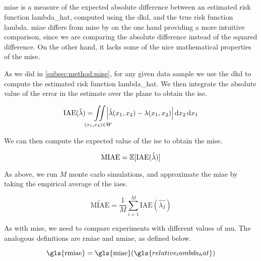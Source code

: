 \subsection{\texorpdfstring{}{}}
\label{subsec:method:miae}

\Gls{miae} is a measure of the expected absolute difference between an estimated risk function \gls{lambda_hat},
computed using the \gls{dkd}, and the true risk function \gls{lambda}.
\Gls{miae} differs from \gls{mise} by on the one hand providing a more intuitive comparison,
since we are comparing the absolute difference instead of the squared difference.
On the other hand, it lacks some of the nice mathematical properties of the \gls{mise}.

As we did in \autoref{subsec:method:mise}, for any given data sample we use the \gls{dkd} to compute the estimated risk function \gls{lambda_hat}.
We then integrate the absolute value of the error in the estimate over the plane to obtain the \gls{ise}.

\begin{equation}
    \mbox{IAE}(\hat{\lambda}) = 
        \iintW{
            \left| \hat{\lambda}\xvec - \lambda\xvec \right|
        }
\end{equation}

We can then compute the expected value of the \gls{ise} to obtain the \gls{mise}.

\begin{equation}
    \mbox{MIAE} = \mathbb{E} [\mbox{IAE}(\hat{\lambda})]
\end{equation}

As above, we run $M$ monte carlo simulations,
and approximate the \gls{miae} by taking the empirical average of the \glspl{iae}.

\begin{equation}
    \widetilde{\mbox{MIAE}} = \frac{1}{M} \sum_{i=1}^{M} \mbox{IAE}(\hat{\lambda_I})
\end{equation}

As with \gls{mise}, we need to compare experiments with different values of \gls{mu}.
The analogous definitions are \gls{rmiae} and \gls{nmiae}, as defined below.

\begin{equation}
\label{eq:rmiae}
    \mbox{\gls{rmiae}} = 
        \mbox{\gls{miae}}(\gls{relative_lambda_hat})
\end{equation}

